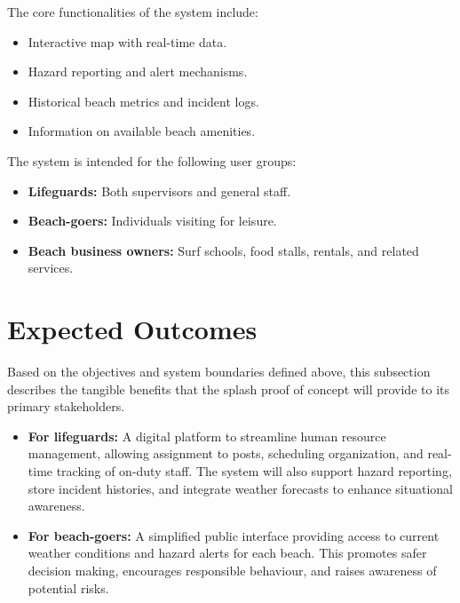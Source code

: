 \noindent The core functionalities of the system include:
\begin{itemize}
    \item Interactive map with real-time data.
    \item Hazard reporting and alert mechanisms.
    \item Historical beach metrics and incident logs.
    \item Information on available beach amenities.
\end{itemize}

\noindent The system is intended for the following user groups:
\begin{itemize}
    \item \textbf{Lifeguards:} Both supervisors and general staff.
    \item \textbf{Beach-goers:} Individuals visiting for leisure.
    \item \textbf{Beach business owners:} Surf schools, food stalls, rentals, and related services.
\end{itemize}

\section{Expected Outcomes}
\label{section:expected_outcomes}
Based on the objectives and system boundaries defined above, this subsection describes the tangible benefits that the \ac{splash} proof of concept will provide to its primary stakeholders.
\begin{itemize}
    \item \textbf{For lifeguards:} A digital platform to streamline human resource management, allowing assignment to posts, scheduling organization, and real-time tracking of on-duty staff. The system will also support hazard reporting, store incident histories, and integrate weather forecasts to enhance situational awareness.
    
    \item \textbf{For beach-goers:} A simplified public interface providing access to current weather conditions and hazard alerts for each beach. This promotes safer decision making, encourages responsible behaviour, and raises awareness of potential risks.
\end{itemize}
